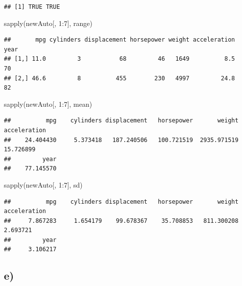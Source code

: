 \documentclass[
]{article}
\newenvironment{Shaded}{\begin{snugshade}}{\end{snugshade}}
\newcommand{\DecValTok}[1]{\textcolor[rgb]{0.00,0.00,0.81}{#1}}
\newcommand{\FunctionTok}[1]{\textcolor[rgb]{0.00,0.00,0.00}{#1}}
\newcommand{\NormalTok}[1]{#1}
\newcommand{\SpecialCharTok}[1]{\textcolor[rgb]{0.00,0.00,0.00}{#1}}
\begin{document}
\begin{verbatim}
## [1] TRUE TRUE
\end{verbatim}

\begin{Shaded}
\begin{Highlighting}[]
\FunctionTok{sapply}\NormalTok{(newAuto[, }\DecValTok{1}\SpecialCharTok{:}\DecValTok{7}\NormalTok{], range)}
\end{Highlighting}
\end{Shaded}

\begin{verbatim}
##       mpg cylinders displacement horsepower weight acceleration year
## [1,] 11.0         3           68         46   1649          8.5   70
## [2,] 46.6         8          455        230   4997         24.8   82
\end{verbatim}

\begin{Shaded}
\begin{Highlighting}[]
\FunctionTok{sapply}\NormalTok{(newAuto[, }\DecValTok{1}\SpecialCharTok{:}\DecValTok{7}\NormalTok{], mean)}
\end{Highlighting}
\end{Shaded}

\begin{verbatim}
##          mpg    cylinders displacement   horsepower       weight acceleration 
##    24.404430     5.373418   187.240506   100.721519  2935.971519    15.726899 
##         year 
##    77.145570
\end{verbatim}

\begin{Shaded}
\begin{Highlighting}[]
\FunctionTok{sapply}\NormalTok{(newAuto[, }\DecValTok{1}\SpecialCharTok{:}\DecValTok{7}\NormalTok{], sd)}
\end{Highlighting}
\end{Shaded}

\begin{verbatim}
##          mpg    cylinders displacement   horsepower       weight acceleration 
##     7.867283     1.654179    99.678367    35.708853   811.300208     2.693721 
##         year 
##     3.106217
\end{verbatim}

\hypertarget{e}{%
\subsection{e)}\label{e}}
\end{document}

